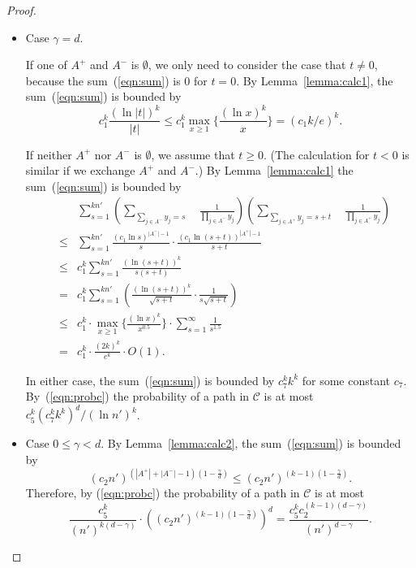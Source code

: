 \documentclass[11pt]{article}
\begin{document}
\begin{proof}
\begin{itemize}
\item Case $\gamma=d$.

If one of $A^+$ and $A^-$ is $\emptyset$, we only need to consider the case that $t\neq0$, because the sum~(\ref{eqn:sum}) is 0 for $t=0$. By Lemma~\ref{lemma:calc1}, the sum~(\ref{eqn:sum}) is bounded by \[c_1^k\frac{(\ln|t|)^k}{|t|}\leq c_1^k\max_{x\geq1}\{\frac{(\ln x)^k}{x}\}=(c_1k/e)^k.\]

If neither $A^+$ nor $A^-$ is $\emptyset$, we assume that $t\geq 0$. (The calculation for $t<0$ is similar if we exchange $A^+$ and $A^-$.) By Lemma~\ref{lemma:calc1} the sum~(\ref{eqn:sum}) is bounded by
\begin{eqnarray*}
&& \sum_{s=1}^{kn'}\left(\sum_{\sum\limits_{j\in A^-}y_j=s}\quad\frac{1}{\prod\limits_{j\in A^-}y_j}\right)\left(\sum_{\sum\limits_{j\in A^+}y_j=s+t}\quad\frac{1}{\prod\limits_{j\in A^+}y_j}\right) \\
& \leq & \sum_{s=1}^{kn'}\frac{(c_1\ln s)^{|A^-|-1}}{s}\cdot\frac{(c_1\ln(s+t))^{|A^+|-1}}{s+t} \\
& \leq & c_1^k\sum_{s=1}^{kn'}\frac{(\ln(s+t))^k}{s(s+t)} \\
& = & c_1^k\sum_{s=1}^{kn'}\left(\frac{(\ln(s+t))^k}{\sqrt{s+t}}\cdot\frac{1}{s\sqrt{s+t}}\right) \\
& \leq & c_1^k\cdot\max_{x\geq1}\{\frac{(\ln x)^k}{x^{0.5}}\}\cdot\sum_{s=1}^\infty\frac{1}{s^{1.5}} \\
& = & c_1^k\cdot\frac{(2k)^k}{e^k}\cdot O(1).
\end{eqnarray*}

In either case, the sum~(\ref{eqn:sum}) is bounded by $c_7^kk^k$ for some constant $c_7$. By~(\ref{eqn:probc}) the probability of a path in $\mathcal{C}$ is at most $c_5^k(c_7^kk^k)^d/(\ln n')^k$.

\item Case $0\leq\gamma<d$. By Lemma~\ref{lemma:calc2}, the sum~(\ref{eqn:sum}) is bounded by
\[(c_2n')^{(|A^+|+|A^-|-1)(1-\frac{\gamma}{d})}\leq(c_2n')^{(k-1)(1-\frac{\gamma}{d})}.\]
Therefore, by (\ref{eqn:probc}) the probability of a path in $\mathcal{C}$ is 
	at most
\[
\frac{c_5^k}{(n')^{k(d-\gamma)}}\cdot\left((c_2n')^{(k-1)(1-\frac{\gamma}{d})}\right)^d
	= \frac{c_5^kc_2^{(k-1)(d-\gamma)}}{(n')^{d-\gamma}}.
\]
\end{itemize}
\end{proof}
\end{document}
